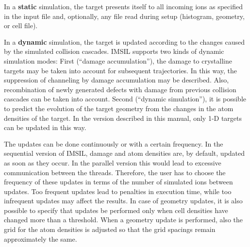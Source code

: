 In a \textbf{static} simulation, the target presents itself to all incoming 
ions as specified in the input file and, optionally, any file read during
setup (histogram, geometry, or cell file).

In a \textbf{dynamic} simulation, the target is updated according to the
changes caused by the simulated collision cascades. 
IMSIL supports two kinds of dynamic simulation modes:
First (``damage accumulation''), the damage to crystalline targets may be
taken into account for subsequent trajectories. 
In this way, the suppression of channeling by damage accumulation may be 
described. 
Also, recombination of newly generated defects with damage from previous 
collision cascades can be taken into account. 
Second (``dynamic simulation''), it is possible to predict the evolution of 
the target geometry from the changes in the atom densities of the target.
In the version described in this manual, only 1-D targets can be updated in 
this way.

The updates can be done continuously or with a certain frequency. 
In the sequential version of IMSIL, damage and atom densities are, by
default, updated as soon as they occur. 
In the parallel version this would lead to excessive communication between 
the threads. 
Therefore, the user has to choose the frequency of these updates in terms of 
the number of simulated ions between updates. 
Too frequent updates lead to penalties in execution time, while too infrequent 
updates may affect the results. 
In case of geometry updates, it is also possible to specify that updates be
performed only when cell densities have changed more than a threshold. 
When a geometry update is performed, also the grid for the atom densities is
adjusted so that the grid spacings remain approximately the same.

